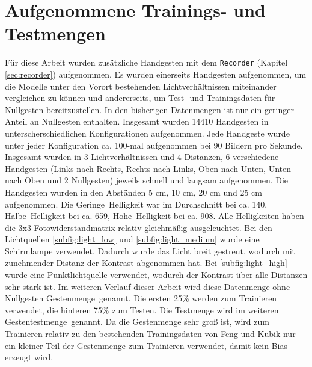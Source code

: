\section{Aufgenommene Trainings- und Testmengen}
\label{sec:DymelData}
Für diese Arbeit wurden zusätzliche Handgesten mit dem \texttt{Recorder} (Kapitel \ref{sec:recorder}) aufgenommen. Es wurden einerseits Handgesten aufgenommen, um die Modelle unter den
Vorort bestehenden Lichtverhältnissen miteinander vergleichen zu können und andererseits, um Test- und Trainingsdaten für Nullgesten bereitzustellen. In den
bisherigen Datenmengen ist nur ein geringer Anteil an Nullgesten enthalten. Insgesamt wurden 14410 Handgesten in unterscherschiedlichen Konfigurationen aufgenommen.
\newline
\newline
Jede Handgeste wurde unter jeder Konfiguration ca. 100-mal aufgenommen bei 90 Bildern pro Sekunde. Insgesamt wurden in 3 Lichtverhältnissen und 4 Distanzen, 6 verschiedene Handgesten (Links nach Rechts,
Rechts nach Links, Oben nach Unten, Unten nach Oben und 2 Nullgesten) jeweils schnell und langsam aufgenommen. Die Handgesten wurden in den Abständen 5 cm, 10 cm, 20 cm und 25 cm aufgenommen.
\newline
\newline
Die \glqq Geringe\grqq\ Helligkeit war im Durchschnitt bei ca. 140, \glqq Halbe\grqq\ Helligkeit bei ca. 659, \glqq Hohe\grqq\ Helligkeit bei ca. 908. Alle Helligkeiten haben die 3x3-Fotowiderstandmatrix
relativ gleichmäßig ausgeleuchtet. Bei den Lichtquellen \ref{subfig:light_low} und \ref{subfig:light_medium} wurde eine Schirmlampe verwendet. Dadurch wurde das Licht breit gestreut,
wodurch mit zunehmender Distanz der Kontrast abgenommen hat. Bei \ref{subfig:light_high} wurde eine Punktlichtquelle verwendet, wodurch der Kontrast über alle Distanzen sehr stark ist.
Im weiteren Verlauf dieser Arbeit wird diese Datenmenge ohne Nullgesten \glqq Gestenmenge\grqq\ genannt. Die ersten 25\% werden zum Trainieren verwendet, die hinteren 75\% zum Testen. Die Testmenge
wird im weiteren \glqq Gestentestmenge\grqq\ genannt. Da die Gestenmenge sehr groß ist, wird zum Trainieren relativ zu den bestehenden Trainingsdaten von Feng und Kubik nur ein kleiner Teil der
Gestenmenge zum Trainieren verwendet, damit kein Bias erzeugt wird.
\newline
\newline
